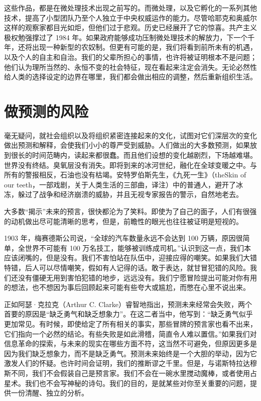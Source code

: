 这些作品，都是在微处理技术出现之前写的。而微处理，以及它孵化的一系列其他技术，提高了小型团队乃至个人独立于中央权威运作的能力。尽管哈耶克和奥威尔这样的观察家都目光如炬，但他们过于悲观。历史已经展开了它的惊喜。共产主义极权勉强撑过了 1984 年。如果政府能够成功压制微处理技术的解放力，下一个千年，还将出现一种新型的农奴制。但更有可能的是，我们将看到前所未有的机遇，以及个人的自主和自治。我们的父辈所担心的事情，也许将被证明根本不是问题；他们认为理所当然的、永恒不变的社会特征，现在看起来注定会消失。无论必然性给人类的选择设定的边界在哪里，我们都会做出相应的调整，然后重新组织生活。


\section{做预测的风险}
毫无疑问，就社会组织以及将组织紧密连接起来的文化，试图对它们深层次的变化做出预测和解释，会使我们小小的尊严受到威胁。人们做出的大多数预测，如果放到很长的时间范畴内，读起来都很蠢。而且他们设想的变化越剧烈，下场越难堪。世界没有终结。臭氧层没有消失。即将到来的冰河世纪，融化在全球变暖之中。与所有的警报相反，石油也没有枯竭。安特罗伯斯先生，《九死一生》（theSkin of our teeth，一部戏剧，关于人类生活的三部曲，译注）中的普通人，避开了冰冻，躲过了战争和经济崩溃的威胁，并且无视专家报告的警示，自然地老去。


大多数“揭示”未来的预言，很快都沦为了笑料。即使为了自己的面子，人们有很强的动机做出尽可能清晰的思考，但是，前瞻性的眼光也往往被证明是短视的。


1903 年，梅赛德斯公司说，“全球的汽车数量永远不会达到 100 万辆，原因很简单，全世界不可能有 100 万名技工，能够被训练成司机。”认识到这一点，我们本应该闭嘴的，但是没有。我们不害怕站在队伍中，迎接应得的嘲笑。如果我们大错特错，后人可以尽情嘲笑，假如有人记得的话。敢于表达，就甘冒犯错的风险。我们还没有僵硬无用到害怕犯错的地步，远远没有。我们宁愿冒险提出可能对你有用的想法，也不想因为事后回顾起来可能有些夸大或尴尬，而憋在心里不说出来。


正如阿瑟·克拉克（Arthur C. Clarke）睿智地指出，预测未来经常会失败，两个首要的原因是“缺乏勇气和缺乏想象力”。在这二者当中，他写到：“缺乏勇气似乎更加常见。有时候，即使给定了所有相关的事实，那些冒牌的预言家也看不出来，它们指向一个必然的结论。有些失败是如此滑稽，简直令人难以置信。”如果我们对信息革命的探索，与未来的现实在哪些方面不符，这当然不可避免，但原因更多是因为我们缺乏想象力，而不是缺乏勇气。预测未来始终是一个大胆的举动，因为它激发人们的怀疑。也许时间会证明，我们的推断谬之千里。但是，与诺斯特拉达穆斯不同，我们不会假装自己是预言家。我们不会在一碗水里搅动魔棒，或者使用占星术。我们也不会写神秘的诗句。我们的目的，是就某些对你至关重要的问题，提供一份清醒、独立的分析。


